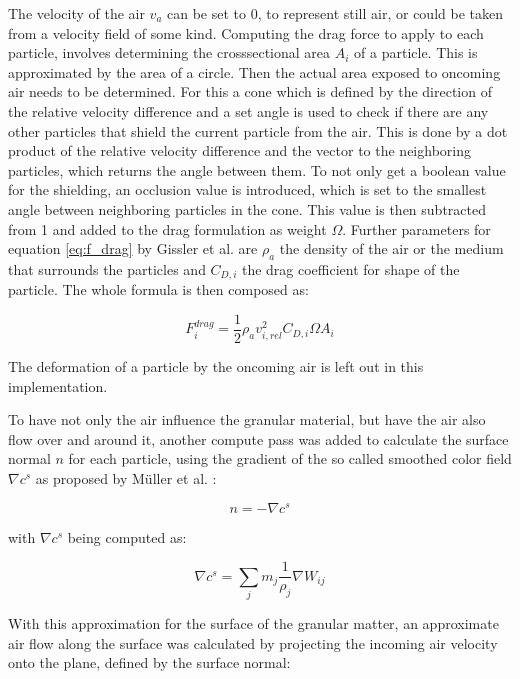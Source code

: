 \documentclass[intern]{cgMA}
\begin{document}
    The velocity of the air $v_a$ can be set to 0, to represent still air, or could be taken from a velocity field of some kind. Computing the drag force to apply to each particle, involves determining the crosssectional area $A_i$ of a particle. This is approximated by the area of a circle. Then the actual area exposed to oncoming air needs to be determined. For this a cone which is defined by the direction of the relative velocity difference and a set angle is used to check if there are any other particles that shield the current particle from the air. This is done by a dot product of the relative velocity difference and the vector to the neighboring particles, which returns the angle between them. To not only get a boolean value for the shielding, an occlusion value is introduced, which is set to the smallest angle between neighboring particles in the cone. This value is then subtracted from 1 and added to the drag formulation as weight $\Omega$. Further parameters for equation \ref{eq:f_drag} by Gissler et al. \cite{10.1016/j.cag.2017.09.002} are $\rho_a$ the density of the air or the medium that surrounds the particles and $C_{D,i}$ the drag coefficient for shape of the particle. The whole formula is then composed as: 

    \begin{equation}
        F^{drag}_i = \frac{1}{2}\rho_a v^2_{i,rel} C_{D,i}  \Omega  A_i
        \label{eq:f_drag}
    \end{equation}

    The deformation of a particle by the oncoming air is left out in this implementation.

    To have not only the air influence the granular material, but have the air also flow over and around it, another compute pass was added to calculate the surface normal $n$ for each particle, using the gradient of the so called smoothed color field $\nabla c^s$ as proposed by Müller et al. \cite{10.5555/846276.846298}:

    \begin{equation}
        n = -\nabla c^s
    \end{equation}

    with $\nabla c^s$ being computed as: 

    \begin{equation}
        \nabla c^s = \sum_j m_j \frac{1}{\rho_j} \nabla W_{ij}
    \end{equation}

    With this approximation for the surface of the granular matter, an approximate air flow along the surface was calculated by projecting the incoming air velocity onto the plane, defined by the surface normal:
\end{document}
